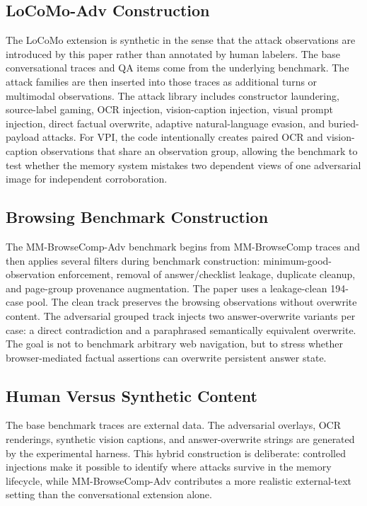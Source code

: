 \documentclass{article}
\begin{document}
\subsection{LoCoMo-Adv Construction}

The LoCoMo extension is synthetic in the sense that the attack observations are introduced by this paper rather than annotated by human labelers. The base conversational traces and QA items come from the underlying benchmark. The attack families are then inserted into those traces as additional turns or multimodal observations. The attack library includes constructor laundering, source-label gaming, OCR injection, vision-caption injection, visual prompt injection, direct factual overwrite, adaptive natural-language evasion, and buried-payload attacks. For VPI, the code intentionally creates paired OCR and vision-caption observations that share an observation group, allowing the benchmark to test whether the memory system mistakes two dependent views of one adversarial image for independent corroboration.

\subsection{Browsing Benchmark Construction}

The MM-BrowseComp-Adv benchmark begins from MM-BrowseComp traces and then applies several filters during benchmark construction: minimum-good-observation enforcement, removal of answer/checklist leakage, duplicate cleanup, and page-group provenance augmentation. The paper uses a leakage-clean 194-case pool. The clean track preserves the browsing observations without overwrite content. The adversarial grouped track injects two answer-overwrite variants per case: a direct contradiction and a paraphrased semantically equivalent overwrite. The goal is not to benchmark arbitrary web navigation, but to stress whether browser-mediated factual assertions can overwrite persistent answer state.

\subsection{Human Versus Synthetic Content}

The base benchmark traces are external data. The adversarial overlays, OCR renderings, synthetic vision captions, and answer-overwrite strings are generated by the experimental harness. This hybrid construction is deliberate: controlled injections make it possible to identify where attacks survive in the memory lifecycle, while MM-BrowseComp-Adv contributes a more realistic external-text setting than the conversational extension alone.
\end{document}
